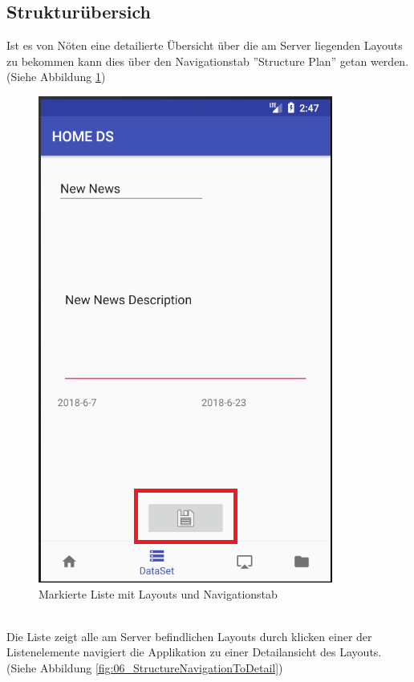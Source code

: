 \subsection{Strukturübersich}
Ist es von Nöten eine detailierte Übersicht über die am Server liegenden Layouts zu bekommen kann dies über den Navigationstab ''Structure Plan'' getan werden.(Siehe Abbildung \ref{fig:06_EditNewsSaveButton}) 
\\
\begin{figure}[H]
\centering
\includegraphics[scale=0.35]{images/06_AndroidApp/06_EditNewsSaveButton}
\caption{Markierte Liste mit Layouts und Navigationstab}
\label{fig:06_EditNewsSaveButton}
\end{figure}
\\
Die Liste zeigt alle am Server befindlichen Layouts durch klicken einer der Listenelemente navigiert die Applikation zu einer Detailansicht des Layouts.(Siehe Abbildung \ref{fig:06_StructureNavigationToDetail})
\\
